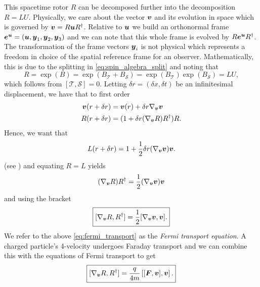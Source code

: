 This spacetime rotor $R$ can be decomposed further into the decomposition $R=LU$. Physically, we care about the vector ${\boldsymbol{v}}$ and its evolution in space which is governed by ${\boldsymbol{v}}=R{\boldsymbol{u}}R^\dagger$. Relative to ${\boldsymbol{u}}$ we build an orthonormal frame $\boldsymbol{e}^{\boldsymbol{u}}=({\boldsymbol{u}},\boldsymbol{y}_1,\boldsymbol{y}_2,\boldsymbol{y}_3)$ and we can note that this whole frame is evolved by $R\boldsymbol{e}^{\boldsymbol{u}}R^\dagger$. The transformation of the frame vectors $\boldsymbol{y}_i$ is not physical which represents a freedom in choice of the spatial reference frame for an observer. Mathematically, this is due to the splitting in \cref{eq:spin_algebra_split} and noting that 
\begin{equation}
    R = \exp(B) = \exp(B_\mathcal{T}+B_\mathcal{S})=\exp(B_\mathcal{T})\exp(B_\mathcal{S})=LU,
\end{equation}
which follows from $[\mathcal{T},\mathcal{S}]=0$. Letting $\delta r = (\delta x,\delta t)$ be an infinitesimal displacement, we have that to first order
\begin{align}
    {\boldsymbol{v}}(r + \delta r) &= {\boldsymbol{v}}(r)+\delta r \nabla_{\boldsymbol{v}} {\boldsymbol{v}}\\
    R(r+\delta r) &= (1+\delta r (\nabla_{\boldsymbol{v}} R) R^\dagger)R.
\end{align}
Hence, we want that
\begin{equation}
    L(r + \delta r) = 1+ \frac{1}{2}\delta r (\nabla_{\boldsymbol{v}} {\boldsymbol{v}}){\boldsymbol{v}}.
\end{equation}
(see \cite{doran_geometric_2003}) and equating $R=L$ yields
\begin{equation}
    (\nabla_{\boldsymbol{v}} R)R^\dagger = \frac{1}{2}(\nabla_{\boldsymbol{v}} {\boldsymbol{v}}){\boldsymbol{v}}
\end{equation}
and using the bracket
\begin{equation}
    \label{eq:fermi_transport}
    \boxed{[\nabla_{\boldsymbol{v}} R, R^\dagger] = \frac{1}{2} [\nabla_{\boldsymbol{v}} {\boldsymbol{v}},{\boldsymbol{v}}].}
\end{equation}
We refer to the above \cref{eq:fermi_transport} as the \emph{Fermi transport equation}. A charged particle's 4-velocity undergoes Faraday transport and we can combine this with the equations of Fermi transport to get
\begin{equation}
    \boxed{[\nabla_{\boldsymbol{v}} R,R^\dagger]= \frac{q}{4m} \left[ [\boldsymbol{F},{\boldsymbol{v}}],{\boldsymbol{v}}\right].}
\end{equation}

